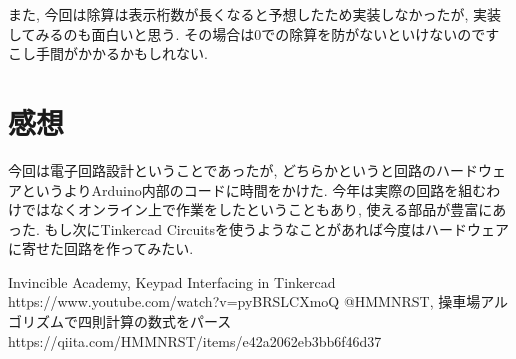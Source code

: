 \documentclass[titlepage]{jsarticle}
\begin{document}
    また, 今回は除算は表示桁数が長くなると予想したため実装しなかったが,
    実装してみるのも面白いと思う.
    その場合は0での除算を防がないといけないのですこし手間がかかるかもしれない.

\section{感想}
    今回は電子回路設計ということであったが,
    どちらかというと回路のハードウェアというよりArduino内部のコードに時間をかけた.
    今年は実際の回路を組むわけではなくオンライン上で作業をしたということもあり,
    使える部品が豊富にあった.
    もし次にTinkercad Circuitsを使うようなことがあれば今度はハードウェアに寄せた回路を作ってみたい.

\begin{thebibliography}{99}
     Invincible Academy, Keypad Interfacing in Tinkercad https://www.youtube.com/watch?v=pyBRSLCXmoQ
     @HMMNRST, 操車場アルゴリズムで四則計算の数式をパース \\ 
        https://qiita.com/HMMNRST/items/e42a2062eb3bb6f46d37
\end{thebibliography}
\end{document}

